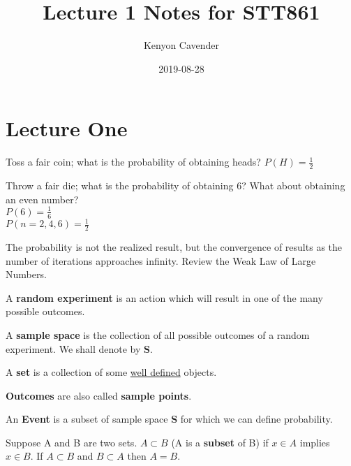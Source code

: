 \documentclass[12pt, oneside, letterpaper]{notes}
\begin{document}
\title{Lecture 1 Notes for STT861}
\author{Kenyon Cavender}
\date{2019-08-28}
\maketitle

\section{Lecture One}

\begin{myex}
  Toss a fair coin; what is the probability of obtaining heads? 
  $P(H) = \frac{1}{2}$
\end{myex}

\begin{myex}
  Throw a fair die; what is the probability of obtaining 6?  
  What about obtaining an even number? \\
\indent$P(6) = \frac{1}{6}$ \\
\indent$P(n = 2,4,6) = \frac{1}{2}$ 
\end{myex}

\noindent The probability is not the realized result, but the 
  convergence of results as the number of iterations approaches 
  infinity.  Review the Weak Law of Large Numbers.

\begin{mydef}
  A \textbf{random experiment} is an action which will result 
  in one of the many possible outcomes. 
\end{mydef}

\begin{mydef}
  A \textbf{sample space} is the collection of all possible 
  outcomes of a random experiment.  We shall denote by \textbf{S}.
\end{mydef}

\begin{mydef}
  A \textbf{set} is a collection of some \underline{well defined} 
  objects.
\end{mydef}

\begin{mydef}
  \textbf{Outcomes} are also called \textbf{sample points}.
\end{mydef}

\begin{mydef}
  An \textbf{Event} is a subset of sample space \textbf{S} for 
  which we can define probability.
\end{mydef}

\begin{mydef}
  Suppose A and B are two sets.  $A \subset B$ (A is a 
  \textbf{subset} of B) if $x \in A$ implies $x \in B$. 
  If $A \subset B$ and $B \subset A$ then $A=B$.
\end{mydef}
\end{document}
